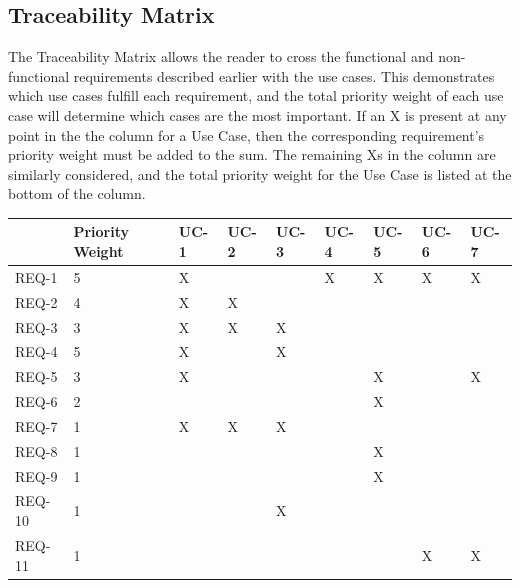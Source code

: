 \documentclass[letterpaper,english, 12pt]{scrreprt}
\begin{document}
\subsection{Traceability Matrix}
The Traceability Matrix allows the reader to cross the functional and non-functional requirements described earlier with the use cases. This demonstrates which use cases fulfill each requirement, and the total priority weight of each use case will determine which cases are the most important. If an X is present at any point in the the column for a Use Case, then the corresponding requirement's priority weight must be added to the sum. The remaining Xs in the column are similarly considered, and the total priority weight for the Use Case is listed at the bottom of the column. 

\renewcommand{\arraystretch}{0.4}
\begin{center}
        \begin{tabular}{|C{1cm}|C{1cm}|C{1cm}|C{1cm}|C{1cm}|C{1cm}|C{1cm}|C{1cm}|C{1cm}|}
                \hline
                         & Priority Weight & UC-1 & UC-2 & UC-3 & UC-4 & UC-5 & UC-6 & UC-7\\
                \hline
                        REQ-1  & 5 & X &   &   & X & X & X & X \\
                \hline
                        REQ-2  & 4 & X & X &   &   &   &   &   \\
                \hline
                        REQ-3  & 3 & X & X & X &   &   &   &   \\
                \hline
                        REQ-4  & 5 & X &   & X &   &   &   &   \\
                \hline
                        REQ-5  & 3 & X &   &   &   & X &   & X \\
                \hline
                        REQ-6  & 2 &   &   &   &   & X &   &   \\
                \hline
                        REQ-7  & 1 & X & X & X &   &   &   &   \\
                \hline
                        REQ-8  & 1 &   &   &   &   & X &   &   \\
                \hline
                        REQ-9  & 1 &   &   &   &   & X &   &   \\
                \hline
                        REQ-10 & 1 &   &   & X &   &   &   &   \\
                \hline
                        REQ-11 & 1 &   &   &   &   &   & X & X \\

\end{tabular}
\end{center}
\end{document}
